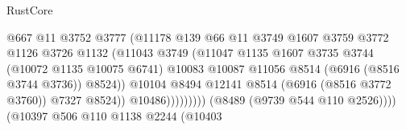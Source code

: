 \begin{lexlean}{RustCore}
\begin{coremodule}
                                                    @667
                                                    @11
                                                    @3752
                                                    @3777
                                                    (@11178
                                                      @139
                                                      @66
                                                      @11
                                                      @3749
                                                      @1607
                                                      @3759
                                                      @3772
                                                      @1126
                                                      @3726
                                                      @1132
                                                      (@11043
                                                        @3749
                                                        (@11047
                                                          @1135
                                                          @1607
                                                          @3735
                                                          @3744
                                                          (@10072 @1135 @10075 @6741)
                                                          @10083
                                                          @10087
                                                          @11056
                                                          @8514
                                                          (@6916 (@8516 @3744 @3736))
                                                          @8524))
                                                      @10104
                                                      @8494
                                                      @12141
                                                      @8514
                                                      (@6916 (@8516 @3772 @3760))
                                                      @7327
                                                      @8524))
                                                  @10486)))))))))
                                (@8489 (@9739 @544 @110 @2526))))
                            (@10397
                              @506
                              @110
                              @1138
                              @2244
                              (@10403

\end{coremodule}
\end{lexlean}
